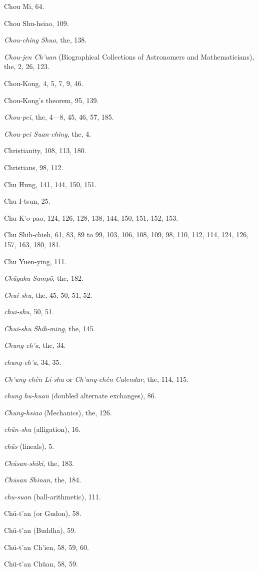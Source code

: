 \documentclass[11pt]{article}
\begin{document}
Chou Mi, 64.\par
Chou Shu-hsiao, 109.\par
\emph{Chou-ching Shuo}, the, 138.\par
\emph{Chou-jen Ch'uan} (Biographical Collections of Astronomers and Mathematicians), the, 2, 26, 123.\par
Chou-Kong, 4, 5, 7, 9, 46.\par
Chou-Kong's theorem, 95, 139.\par
\emph{Chou-pei}, the, 4---8, 45, 46, 57, 185.\par
\emph{Chou-pei Suan-ching}, the, 4.\par
Christianity, 108, 113, 180.\par
Christians, 98, 112.\par
Chu Hung, 141, 144, 150, 151.\par
Chu I-tsun, 25.\par
Chu K'o-pao, 124, 126, 128, 138, 144, 150, 151, 152, 153.\par
Chu Shih-chieh, 61, 83, 89 to 99, 103, 106, 108, 109, 98, 110, 112, 114, 124, 126, 157, 163, 180, 181.\par
Chu Yuen-ying, 111.\par
\emph{Chūgaku Sampō}, the, 182.\par
\emph{Chui-shu}, the, 45, 50, 51, 52.\par
\emph{chui-shu}, 50, 51.\par
\emph{Chui-shu Shih-ming}, the, 145.\par
\emph{Chung-ch'a}, the, 34.\par
\emph{chung-ch'a}, 34, 35.\par
\emph{Ch'ung-chên Li-shu} or \emph{Ch'ung-chên Calendar}, the, 114, 115.\par
\emph{chung hu-huan} (doubled alternate exchanges), 86.\par
\emph{Chung-hsiao} (Mechanics), the, 126.\par
\emph{chün-shu} (alligation), 16.\par
\emph{chüs} (lineals), 5.\par
\emph{Chūsan-shiki}, the, 183.\par
\emph{Chūsan Shinan}, the, 184.\par
\emph{chu-suan} (ball-arithmetic), 111.\par
Chü-t'an (or Gudon), 58.\par
Chü-t'an (Buddha), 59.\par
Chü-t'an Ch'ien, 58, 59, 60.\par
Chü-t'an Chüan, 58, 59.\par
\end{document}
